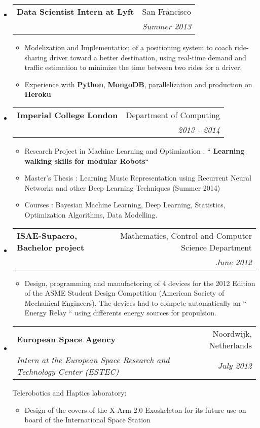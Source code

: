 \documentclass[letterpaper,11pt]{article}
\makeatletter
\newcommand{\resitem}[1]{\item #1 \vspace{-2pt}}
\newcommand{\ressubheading}[4]{
\begin{tabular*}{6.5in}{l@{\cftdotfill{\cftsecdotsep}\extracolsep{\fill}}r}
		\textbf{#1} & #2 \\
		\textit{#3} & \textit{#4} \\
\end{tabular*}\vspace{-6pt}}
\makeatother
\begin{document}
\begin{itemize}
    \item
\ressubheading{Data Scientist Intern at Lyft}{San Francisco}{}{Summer 2013}
    \begin{itemize}
        \item Modelization and Implementation of a positioning system to coach ride-sharing driver toward a better destination, using real-time demand and traffic estimation to minimize the time between two rides for a driver.
        \item Experience with \textbf{Python}, \textbf{MongoDB}, parallelization and production on \textbf{Heroku}
    \end{itemize}


    \item
\ressubheading{Imperial College London}{Department of Computing}{}{2013 - 2014}
    \begin{itemize}

        \item Research Project in Machine Learning and Optimization : `` \textbf{Learning walking skills for modular Robots}``
        \item Master's Thesis : Learning Music Representation using Recurrent Neural Networks and other Deep Learning Techniques (Summer 2014)
        \item Courses : Bayesian Machine Learning, Deep Learning, Statistics, Optimization Algorithms, Data Modelling.
    \end{itemize}



\item
	\ressubheading{ISAE-Supaero, Bachelor project}{Mathematics, Control and Computer Science Department}{}{June 2012}
		\begin{itemize}
\item Design, programming and manufactoring of 4 devices for the 2012 Edition of the ASME Student Design Competition (American Society of Mechanical Engineers). The devices had to compete automatically an `` Energy Relay `` using differents energy sources for propulsion.
	\end{itemize}


\item
	\ressubheading{European Space Agency}{Noordwijk, Netherlands}{ Intern at the European Space Research and Technology Center (ESTEC)}{July 2012}
\vspace{0.2cm}

Telerobotics and Haptics laboratory:
	\begin{itemize}
		\resitem{Design of the covers of the X-Arm 2.0 Exoskeleton for its future use on board of the International Space Station }
	\end{itemize}
\end{itemize}
\end{document}
